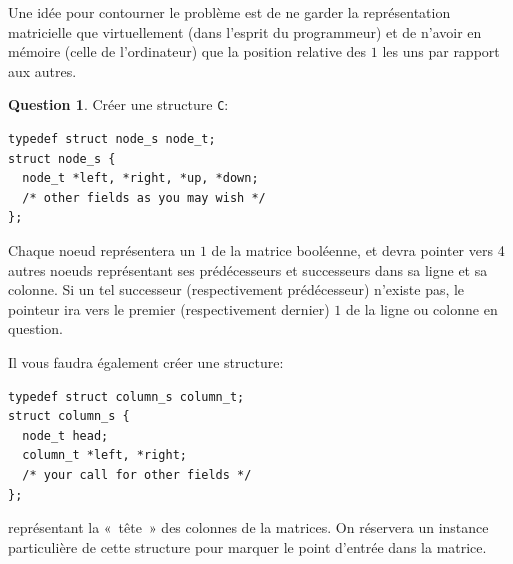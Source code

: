 \documentclass[french,a4paper]{article}
\theoremstyle{definition}
\newtheorem{question}{Question}
\theoremstyle{remark}
\begin{document}
Une idée pour contourner le problème est de ne garder la
représentation matricielle que virtuellement (dans l'esprit du
programmeur) et de n'avoir en mémoire (celle de l'ordinateur) que la
position relative des $1$ les uns par rapport aux autres.
\begin{question}
  Créer une structure {\tt C}:
  \begin{lstlisting}
typedef struct node_s node_t;
struct node_s {
  node_t *left, *right, *up, *down;
  /* other fields as you may wish */
};
  \end{lstlisting}
  Chaque noeud représentera un $1$ de la matrice booléenne, et devra
  pointer vers 4 autres noeuds représentant ses prédécesseurs et
  successeurs dans sa ligne et sa colonne. Si un tel successeur
  (respectivement prédécesseur) n'existe pas, le pointeur ira vers le
  premier (respectivement dernier) $1$ de la ligne ou colonne en
  question.

  Il vous faudra également créer une structure:
  \begin{lstlisting}
typedef struct column_s column_t;
struct column_s {
  node_t head;
  column_t *left, *right;
  /* your call for other fields */
};
  \end{lstlisting}
  représentant la «~tête~» des colonnes de la matrices. On réservera
  un instance particulière de cette structure pour marquer le point
  d'entrée dans la matrice.


\end{question}
\end{document}

